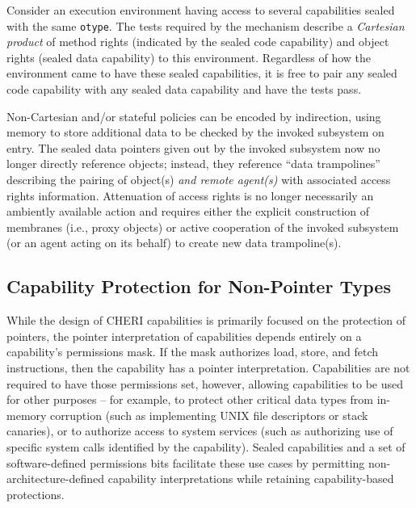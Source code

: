 Consider an execution environment having access to several capabilities
sealed with the same \texttt{otype}.  The tests required by the
 mechanism describe a \emph{Cartesian product} of method
rights (indicated by the sealed code capability) and object rights (sealed data
capability) to this environment.  Regardless of how the environment
came to have these sealed capabilities, it is free to pair any sealed code
capability with any sealed data capability and have the 
tests pass.

Non-Cartesian and/or stateful policies can be encoded by
indirection, using memory to store additional data to be checked by the
invoked subsystem on entry.  The sealed data pointers given out by the
invoked subsystem now no longer directly reference objects; instead, they
reference ``data trampolines'' describing the pairing of object(s) \emph{and
remote agent(s)} with associated access rights information.  Attenuation of
access rights is no longer necessarily an ambiently available action and
requires either the explicit construction of membranes (i.e., proxy objects)
or active cooperation of the invoked subsystem (or an agent acting on its
behalf) to create new data trampoline(s).

\subsection{Capability Protection for Non-Pointer Types}

While the design of CHERI capabilities is primarily focused on the protection
of pointers, the pointer interpretation of capabilities depends entirely on
a capability's permissions mask.
If the mask authorizes load, store, and fetch instructions, then the
capability has a pointer interpretation.
Capabilities are not required to have those permissions set, however, allowing
capabilities to be used for other purposes -- for example, to protect other
critical data types from in-memory corruption (such as implementing UNIX file
descriptors or stack canaries), or to authorize access to system services
(such as authorizing use of specific system calls identified by the
capability).
Sealed capabilities and a set of software-defined permissions bits facilitate
these use cases by permitting non-architecture-defined capability
interpretations while retaining capability-based protections.

